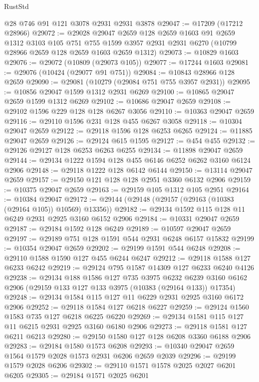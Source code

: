 \begin{lexlean}{RustStd}
\begin{coremodule}
    @28
    @746
    @91
    @121
    @3078
    @2931
    @2931
    @3878
@29047 := @17209 (@17212 @28966)
@29072 := @29028
    @29047
    @2659
    @128
    @2659
    @1603
    @91
    @2659
    @1312
    @3103
    @105
    @751
    @755
    @1599
    @3957
    @2931
    @2931
    @6270
    (@10799 @28966 @2659 @128 @2659 @1603 @2659 @1312)
@29073 := @10829 @1603
@29076 := @29072 (@10809 (@29073 @105))
@29077 := @17244 @1603
@29081 := @29076 (@10424 (@29077 @91 @751))
@29084 := @10843 @28966 @128 @2659
@29090 := @29081 (@10279 (@29084 @751 @755 @3957 @2931))
@29095 := @10856 @29047 @1599 @1312 @2931 @6269
@29100 := @10865 @29047 @2659 @1599 @1312 @6269
@29102 := @10686 @29047 @2659
@29108 := @29102 @1596 @229 @128 @128 @6267 @3056
@29110 := @10363 @29047 @2659
@29116 := @29110 @1596 @231 @128 @455 @6267 @3058
@29118 := @10304 @29047 @2659
@29122 := @29118 @1596 @128 @6253 @6265
@29124 := @11885 @29047 @2659
@29126 := @29124 @615 @1595
@29127 := @454 @455
@29132 := @29126 @29127 @128 @6253 @6263 @6255
@29134 := @11898 @29047 @2659
@29144 := @29134 @1222 @1594 @128 @455 @6146 @6252 @6262 @3160 @6124 @2906
@29148 := @29118 @1222 @128 @6142 @6144
@29150 := @13114 @29047 @2659
@29157 := @29150 @121 @128 @128 @2951 @3360 @6132 @2906
@29159 := @10375 @29047 @2659
@29163 := @29159 @105 @1312 @105 @2951
@29164 := @10384 @29047
@29172 := @29144 (@29148 (@29157 (@29163 (@10383 (@29164 @105)) @10569) @13356))
@29182 := @29134 @1592 @115 @128 @11 @6249 @2931 @2925 @3160 @6152 @2906
@29184 := @10331 @29047 @2659
@29187 := @29184 @1592 @128 @6249
@29189 := @10597 @29047 @2659
@29197 := @29189 @751 @128 @1591 @544 @2931 @6248 @6157 @15832
@29199 := @10354 @29047 @2659
@29202 := @29199 @1591 @544 @6248
@29208 := @29110 @1588 @1590 @127 @455 @6244 @6247
@29212 := @29118 @1588 @127 @6233 @6242
@29219 := @29124 @795 @1587 @14309 @127 @6233 @6240 @4126
@29238 := @29134
    @188
    @1586
    @127
    @735
    @3975
    @6232
    @6239
    @3160
    @6162
    @2906
    (@29159 @133 @127 @133 @3975 (@10383 (@29164 @133)) @17354)
@29248 := @29134 @1584 @115 @127 @11 @6229 @2931 @2925 @3160 @6172 @2906
@29252 := @29118 @1584 @127 @6218 @6227
@29259 := @29124 @1560 @1583 @735 @127 @6218 @6225 @6220
@29269 := @29134 @1581 @115 @127 @11 @6215 @2931 @2925 @3160 @6180 @2906
@29273 := @29118 @1581 @127 @6211 @6213
@29280 := @29150 @1580 @127 @128 @6208 @3360 @6188 @2906
@29283 := @29184 @1580 @1573 @6208
@29293 := @10340 @29047 @2659 @1564 @1579 @2028 @1573 @2931 @6206 @2659 @2039
@29296 := @29199 @1579 @2028 @6206
@29302 := @29110 @1571 @1578 @2025 @2027 @6201 @6205
@29305 := @29184 @1571 @2025 @6201

\end{coremodule}
\end{lexlean}
